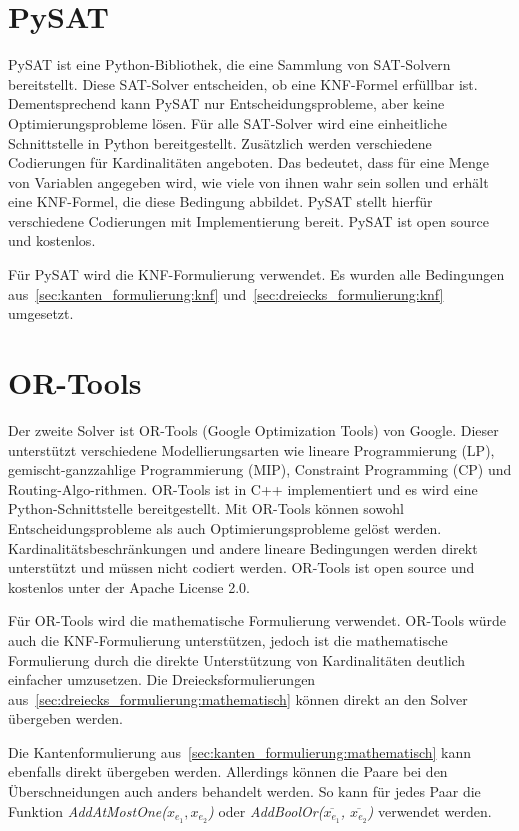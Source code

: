 \section{PySAT}
\label{sec:pysat}
PySAT ist eine Python-Bibliothek, die eine Sammlung von SAT-Solvern bereitstellt.
Diese SAT-Solver entscheiden, ob eine KNF-Formel erfüllbar ist.
Dementsprechend kann PySAT nur Entscheidungsprobleme, aber keine Optimierungsprobleme lösen.
Für alle SAT-Solver wird eine einheitliche Schnittstelle in Python bereitgestellt.
Zusätzlich werden verschiedene Codierungen für Kardinalitäten angeboten.
Das bedeutet, dass für eine Menge von Variablen angegeben wird, wie viele von ihnen wahr sein sollen und erhält eine KNF-Formel, die diese Bedingung abbildet.
PySAT stellt hierfür verschiedene Codierungen mit Implementierung bereit.
PySAT ist open source und kostenlos.

Für PySAT wird die KNF-Formulierung verwendet.
Es wurden alle Bedingungen aus~\cref{sec:kanten_formulierung:knf} und~\cref{sec:dreiecks_formulierung:knf} umgesetzt.





\section{OR-Tools}
Der zweite Solver ist OR-Tools (Google Optimization Tools) von Google.
Dieser unterstützt verschiedene Modellierungsarten wie lineare Programmierung (LP), gemischt-ganzzahlige Programmierung (MIP), Constraint Programming (CP) und Routing-Algo-rithmen.
OR-Tools ist in C++ implementiert und es wird eine Python-Schnittstelle bereitgestellt.
Mit OR-Tools können sowohl Entscheidungsprobleme als auch Optimierungsprobleme gelöst werden.
Kardinalitätsbeschränkungen und andere lineare Bedingungen werden direkt unterstützt und müssen nicht codiert werden.
OR-Tools ist open source und kostenlos unter der Apache License 2.0.

Für OR-Tools wird die mathematische Formulierung verwendet.
OR-Tools würde auch die KNF-Formulierung unterstützen, jedoch ist die mathematische Formulierung durch die direkte Unterstützung von Kardinalitäten deutlich einfacher umzusetzen.
Die Dreiecksformulierungen aus~\cref{sec:dreiecks_formulierung:mathematisch} können direkt an den Solver übergeben werden.

Die Kantenformulierung aus~\cref{sec:kanten_formulierung:mathematisch} kann ebenfalls direkt übergeben werden.
Allerdings können die Paare bei den Überschneidungen auch anders behandelt werden.
So kann für jedes Paar die Funktion \emph{AddAtMostOne(\(x_{e_1}, x_{e_2}\))} oder \emph{AddBoolOr(\(\overline{x_{e_1}}\), \(\overline{x_{e_2}}\))} verwendet werden.

